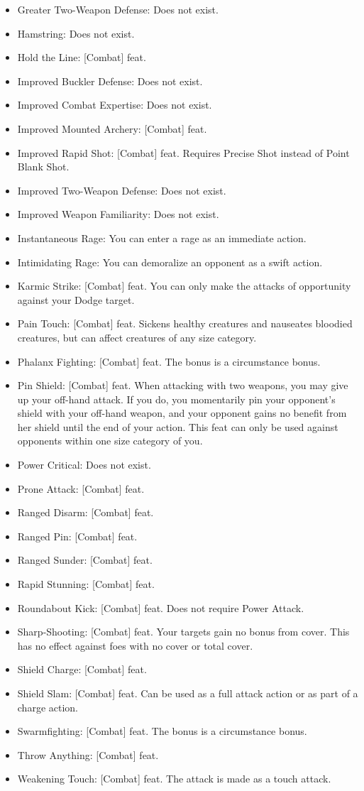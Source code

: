 \begin{itemize}
\item Greater Two-Weapon Defense: Does not exist.
\item Hamstring: Does not exist.
\item Hold the Line: [Combat] feat.
\item Improved Buckler Defense: Does not exist.
\item Improved Combat Expertise: Does not exist.
\item Improved Mounted Archery: [Combat] feat.
\item Improved Rapid Shot: [Combat] feat. Requires Precise Shot instead of Point Blank Shot.
\item Improved Two-Weapon Defense: Does not exist.
\item Improved Weapon Familiarity: Does not exist.
\item Instantaneous Rage: You can enter a rage as an immediate action.
\item Intimidating Rage: You can demoralize an opponent as a swift action.
\item Karmic Strike: [Combat] feat. You can only make the attacks of opportunity against your Dodge target.
\item Pain Touch: [Combat] feat. Sickens healthy creatures and nauseates bloodied creatures, but can affect creatures of any size category.
\item Phalanx Fighting: [Combat] feat. The bonus is a circumstance bonus.
\item Pin Shield: [Combat] feat. When attacking with two weapons, you may give up your off-hand attack. If you do, you momentarily pin your opponent's shield with your off-hand weapon, and your opponent gains no benefit from her shield until the end of your action. This feat can only be used against opponents within one size category of you.
\item Power Critical: Does not exist.
\item Prone Attack: [Combat] feat.
\item Ranged Disarm: [Combat] feat.
\item Ranged Pin: [Combat] feat.
\item Ranged Sunder: [Combat] feat.
\item Rapid Stunning: [Combat] feat.
\item Roundabout Kick: [Combat] feat. Does not require Power Attack.
\item Sharp-Shooting: [Combat] feat. Your targets gain no bonus from cover. This has no effect against foes with no cover or total cover.
\item Shield Charge: [Combat] feat.
\item Shield Slam: [Combat] feat. Can be used as a full attack action or as part of a charge action.
\item Swarmfighting: [Combat] feat. The bonus is a circumstance bonus.
\item Throw Anything: [Combat] feat.
\item Weakening Touch: [Combat] feat. The attack is made as a touch attack.
\end{itemize}
